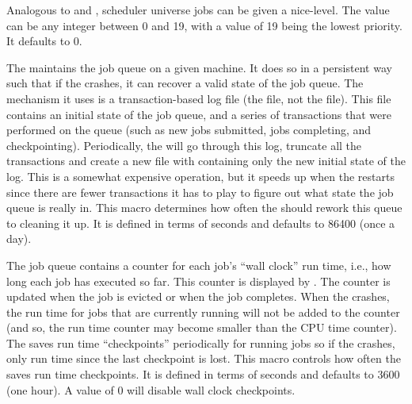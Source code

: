 \begin{description}
\label{param:SchedUnivReniceIncrement}
\item[\Macro{SCHED\_UNIV\_RENICE\_INCREMENT}]
  Analogous to  and
  , scheduler universe jobs can be
  given a nice-level.  The value can be any integer between 0 and 19,
  with a value of 19 being the lowest priority.  It defaults to 0.

\label{param:QueueCleanInterval}
\item[\Macro{QUEUE\_CLEAN\_INTERVAL}]
  The  maintains the job queue on a given machine.  It does so
  in a persistent way such that if the  crashes, it can recover
  a valid state of the job queue.  The mechanism it uses is a
  transaction-based log file (the  file,
  not the  file).  This file contains an initial
  state of the job queue, and a series of transactions that were
  performed on the queue (such as new jobs submitted, jobs completing,
  and checkpointing).  Periodically, the  will go through
  this log, truncate all the transactions and create a new file with
  containing only the new initial state of the log.
  This is a somewhat expensive operation,
  but it speeds up when the  restarts since there are
  fewer transactions it has to play to figure out what state the job
  queue is really in.  This macro determines how often the 
  should rework this queue to cleaning it up.  It is defined in terms of
  seconds and defaults to 86400 (once a day). 
  
\label{param:WallClockCkptInterval}
\item[\Macro{WALL\_CLOCK\_CKPT\_INTERVAL}]
  The job queue contains a counter for each job's ``wall clock'' run
  time, i.e., how long each job has executed so far.  This counter is
  displayed by .  The counter is updated when the job is
  evicted or when the job completes.  When the  crashes, the run
  time for jobs that are currently running will not be added to the
  counter (and so, the run time counter may become smaller than the
  CPU time counter).  The  saves run time ``checkpoints''
  periodically for running jobs so if the  crashes, only run
  time since the last checkpoint is lost.  This macro controls how
  often the  saves run time checkpoints.  It is defined in terms
  of seconds and defaults to 3600 (one hour).  A value of 0 will
  disable wall clock checkpoints.


\end{description}
